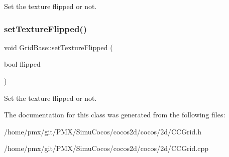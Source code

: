 Set the texture flipped or not. \mbox{\label{classGridBase_a056aba2cf7d266d1484fa0196863d1e7}} 
\subsubsection{\texorpdfstring{set\+Texture\+Flipped()}{setTextureFlipped()}\hspace{0.1cm}{\footnotesize\ttfamily [2/2]}}
{\footnotesize\ttfamily void Grid\+Base\+::set\+Texture\+Flipped (\begin{DoxyParamCaption}\item[{bool}]{flipped }\end{DoxyParamCaption})}

Set the texture flipped or not. 

The documentation for this class was generated from the following files\+:\begin{DoxyCompactItemize}
\item 
/home/pmx/git/\+P\+M\+X/\+Simu\+Cocos/cocos2d/cocos/2d/C\+C\+Grid.\+h\item 
/home/pmx/git/\+P\+M\+X/\+Simu\+Cocos/cocos2d/cocos/2d/C\+C\+Grid.\+cpp\end{DoxyCompactItemize}

